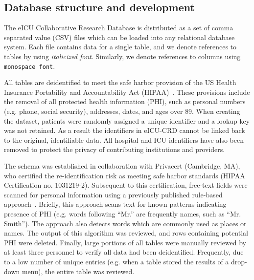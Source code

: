 \documentclass[english]{article}
\newcommand{\colname}[1]{\texttt{#1}}
\newcommand{\tblname}[1]{\emph{#1}}
\begin{document}


\subsection*{Database structure and development}\label{database-structure-and-development}

The eICU Collaborative Research Database is distributed as a set of comma separated value (CSV) files which can be loaded into any relational database system. Each file contains data for a single table, and we denote references to tables by using \tblname{italicized font}. Similarly, we denote references to columns using \colname{monospace font}.

All tables are deidentified to meet the safe harbor provision of the US Health Insurance Portability and Accountability Act (HIPAA)~\cite{HIPAA}. These provisions include the removal of all protected health information (PHI), such as personal numbers (e.g. phone, social security), addresses, dates, and ages over 89. When creating the dataset, patients were randomly assigned a unique identifier and a lookup key was not retained. As a result the identifiers in eICU-CRD cannot be linked back to the original, identifiable data. All hospital and ICU identifiers have also been removed to protect the privacy of contributing institutions and providers.

The schema was established in collaboration with Privacert (Cambridge, MA), who certified the re-identification risk as meeting safe harbor standards (HIPAA Certification no. 1031219-2). Subsequent to this certification, free-text fields were scanned for personal information using a previously published rule-based approach~\cite{neamatullah2008automated}. Briefly, this approach scans text for known patterns indicating presence of PHI (e.g. words following ``Mr.'' are frequently names, such as ``Mr. Smith''). The approach also detects words which are commonly used as places or names. The output of this algorithm was reviewed, and rows containing potential PHI were deleted. Finally, large portions of all tables were manually reviewed by at least three personnel to verify all data had been deidentified. Frequently, due to a low number of unique entries (e.g. when a table stored the results of a drop-down menu), the entire table was reviewed.
\end{document}
